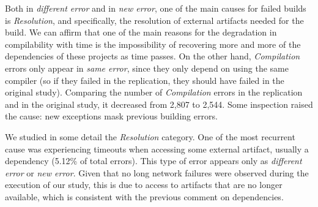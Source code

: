 Both in \textit{different error} and in \textit{new error}, one of the main causes for failed builds is \textit{Resolution}, and specifically, the resolution of external artifacts needed for the build. We can affirm that one of the main reasons for the degradation in compilability with time is the impossibility of recovering more and more of the dependencies of these projects as time passes. On the other hand, \textit{Compilation} errors only appear in \textit{same error}, since they only depend on using the same compiler (so if they failed in the replication, they should have failed in the original study). Comparing the number of \textit{Compilation} errors in the replication and in the original study, it decreased from 2,807 to 2,544. Some inspection raised the cause: new exceptions mask previous building errors.

We studied in some detail the \textit{Resolution} category. One of the most recurrent cause was experiencing timeouts when accessing some external artifact, usually a dependency (5.12\% of total errors). This type of error appears only as \textit{different error} or \textit{new error}. Given that no long network failures were observed during the execution of our study, this is due to access to artifacts that are no longer available, which is consistent with the previous comment on dependencies.

\vspace{0.2cm}
